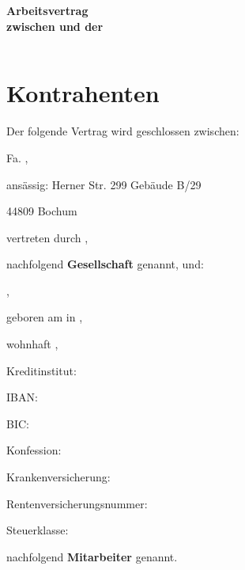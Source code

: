 \documentclass[twoside,a4paper]{scrreprt}
\begin{document}
\begin{minipage}[c][0.3\textheight][b]{\textwidth}
    \centering
    \Huge{\textbf{Arbeitsvertrag\\ zwischen \Vorname \white \Nachname \white und der \Arbeitgeber}}
\end{minipage}
\vfill

\begin{minipage}[b]{0.8\textwidth}
\scriptsize
    \begin{tabularx}{\linewidth}{XX}
        
    \end{tabularx}
\end{minipage}
\hfill


\newpage
\centering
\section*{Kontrahenten}
    Der folgende Vertrag wird geschlossen zwischen:
    
    \centerline{ }
    \centerline{Fa. \Arbeitgeber,}
    \centerline{ansässig: Herner Str. 299 Gebäude B/29}
    \centerline{44809 Bochum}
    \centerline{ }
    \centerline{vertreten durch \Vertreter,}
    \centerline{ }
    nachfolgend \textbf{Gesellschaft} genannt, und:
    \centerline{ }
    \centerline{\Vorname \white \Nachname,}
    \centerline{geboren am \Geburtstag\white in \Geburtsort,}
    \centerline{wohnhaft \MAAnschriftStr \white \MAAnschriftNr,}
    \centerline{\MAAnschriftPLZ \white \MAAnschriftStadt}
    \centerline{}
    \centerline{Kreditinstitut: \KontoInstitut}
    \centerline{IBAN: \KontoIBAN}
    \centerline{BIC: \KontoBIC }
    \centerline{}
    \centerline{Konfession: \Konfession}
    \centerline{Krankenversicherung: \Krankenversicherung}
    \centerline{Rentenversicherungsnummer: \Rentenversicherungsnummer}
    \centerline{Steuerklasse: \Steuerklasse}
    \centerline{}
    
    nachfolgend \textbf{Mitarbeiter} genannt.
\end{document}
